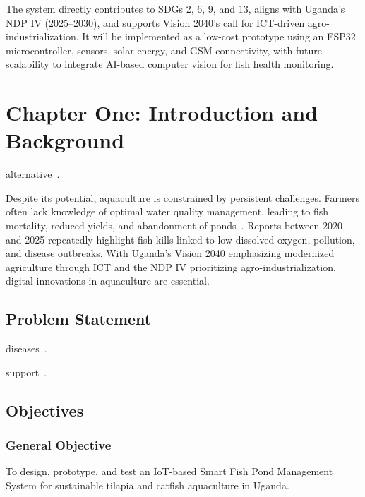 \documentclass[12pt,a4paper]{report}
\begin{document}
The system directly contributes to SDGs 2, 6, 9, and 13, aligns with Uganda’s NDP IV (2025–2030), and supports Vision 2040’s call for ICT-driven agro-industrialization. It will be implemented as a low-cost prototype using an ESP32 microcontroller, sensors, solar energy, and GSM connectivity, with future scalability to integrate AI-based computer vision for fish health monitoring.  

\tableofcontents
\clearpage

\chapter{Chapter One: Introduction and Background}
\noindent
alternative~\cite{aanyu2020potential}.

Despite its potential, aquaculture is constrained by persistent challenges. Farmers often lack knowledge of optimal water quality management, leading to fish mortality, reduced yields, and abandonment of ponds~\cite{tumwesigye2022effect}. Reports between 2020 and 2025 repeatedly highlight fish kills linked to low dissolved oxygen, pollution, and disease outbreaks. With Uganda’s Vision 2040 emphasizing modernized agriculture through ICT and the NDP IV prioritizing agro-industrialization, digital innovations in aquaculture are essential.  

\section{Problem Statement}
diseases~\cite{tumwesigye2022effect}.

support~\cite{byabasaija2025unlocking}.

\section{Objectives}
\subsection*{General Objective}
To design, prototype, and test an IoT-based Smart Fish Pond Management System for sustainable tilapia and catfish aquaculture in Uganda.  
\end{document}
